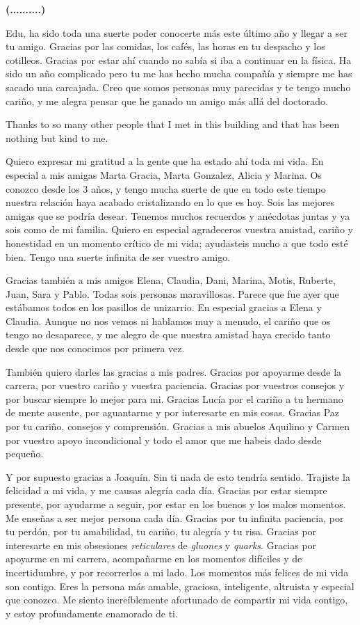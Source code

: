 \textbf{(..........)}

Edu, ha sido toda una suerte poder conocerte más este último año y llegar a ser tu amigo. Gracias por las comidas, los cafés, las horas en tu despacho y los cotilleos. Gracias por estar ahí cuando no sabía si iba a continuar en la física. Ha sido un año complicado pero tu me has hecho mucha compañía y siempre me has sacado una carcajada. Creo que somos personas muy parecidas y te tengo mucho cariño, y me alegra pensar que he ganado un amigo más allá del doctorado.

Thanks to so many other people that I met in this building and that has been nothing but kind to me. 

Quiero expresar mi gratitud a la gente que ha estado ahí toda mi vida. En especial a mis amigas Marta Gracia, Marta Gonzalez, Alicia y Marina. Os conozco desde los 3 años, y tengo mucha suerte de que en todo este tiempo nuestra relación haya acabado cristalizando en lo que es hoy. Sois las mejores amigas que se podría desear. Tenemos muchos recuerdos y anécdotas juntas y ya sois como de mi familia. Quiero en especial agradeceros vuestra amistad, cariño y honestidad en un momento crítico de mi vida; ayudasteis mucho a que todo esté bien. Tengo una suerte infinita de ser vuestro amigo.

Gracias también a mis amigos Elena, Claudia, Dani, Marina, Motis, Ruberte, Juan, Sara y Pablo. Todas sois personas maravillosas. Parece que fue ayer que estábamos todos en los pasillos de unizarrio. En especial gracias a Elena y Claudia. Aunque no nos vemos ni hablamos muy a menudo, el cariño que os tengo no desaparece, y me alegro de que nuestra amistad haya crecido tanto desde que nos conocimos por primera vez.

También quiero darles las gracias a mis padres. Gracias por apoyarme desde la carrera, por vuestro cariño y vuestra paciencia. Gracias por vuestros consejos y por buscar siempre lo mejor para mi. Gracias Lucía por el cariño a tu hermano de mente ausente, por aguantarme y por interesarte en mis cosas. Gracias Paz por tu cariño, consejos y comprensión. Gracias a mis abuelos Aquilino y Carmen por vuestro apoyo incondicional y todo el amor que me habeis dado desde pequeño. 

Y por supuesto gracias a Joaquín. Sin ti nada de esto tendría sentido. Trajiste la felicidad a mi vida, y me causas alegría cada día. Gracias por estar siempre presente, por ayudarme a seguir, por estar en los buenos y los malos momentos. Me enseñas a ser mejor persona cada día. Gracias por tu infinita paciencia, por tu perdón, por tu amabilidad, tu cariño, tu alegría y tu risa. Gracias por interesarte en mis obsesiones \textit{reticulares} de \textit{gluones} y \textit{quarks}. Gracias por apoyarme en mi carrera, acompañarme en los momentos difíciles y de incertidumbre, y por recorrerlos a mi lado. Los momentos más felices de mi vida son contigo. Eres la persona más amable, graciosa, inteligente, altruista y especial que conozco. Me siento increíblemente afortunado de compartir mi vida contigo, y estoy profundamente enamorado de ti.

